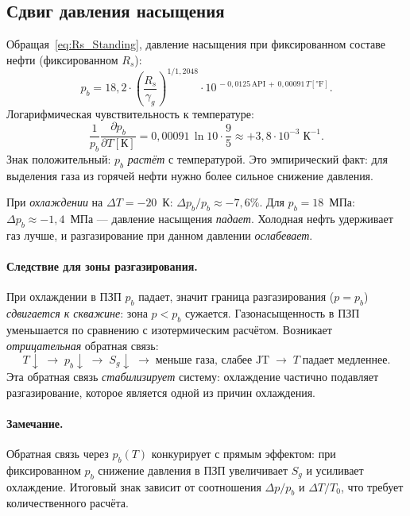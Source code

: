 ﻿\documentclass[12pt,a4paper]{article}
\begin{document}
\subsection{Сдвиг давления насыщения}\label{ssec:pb_shift}

Обращая~\eqref{eq:Rs_Standing}, давление насыщения при
фиксированном составе нефти (фиксированном $R_s$):
\begin{equation}\label{eq:pb_Standing}
  p_b = 18{,}2 \cdot
  \left(\frac{R_s}{\gamma_g}\right)^{1/1{,}2048}
  \cdot 10^{\,-0{,}0125\,\text{API}\,+\,0{,}00091\,T[\text{°F}]}.
\end{equation}
Логарифмическая чувствительность к температуре:
\begin{equation}\label{eq:dpbdT}
  \frac{1}{p_b}\frac{\partial p_b}{\partial T[\text{К}]}
  = 0{,}00091\,\ln 10 \cdot \frac{9}{5}
  \approx +3{,}8 \cdot 10^{-3}\;\text{К}^{-1}.
\end{equation}
Знак положительный: $p_b$ \emph{растёт} с температурой.
Это эмпирический факт: для выделения газа из горячей
нефти нужно более сильное снижение давления.

При \emph{охлаждении} на $\Delta T = -20$~К:
$\Delta p_b / p_b \approx -7{,}6\%$.
Для $p_b = 18$~МПа: $\Delta p_b \approx -1{,}4$~МПа ---
давление насыщения \emph{падает}. Холодная нефть удерживает
газ лучше, и разгазирование при данном давлении
\emph{ослабевает}.

\paragraph{Следствие для зоны разгазирования.}
При охлаждении в ПЗП $p_b$ падает, значит граница
разгазирования ($p = p_b$) \emph{сдвигается к скважине}:
зона $p < p_b$ сужается. Газонасыщенность в ПЗП уменьшается
по сравнению с изотермическим расчётом. Возникает
\emph{отрицательная} обратная связь:
\[
  T\!\downarrow\;\to\; p_b\!\downarrow\;\to\;
  S_g\!\downarrow\;\to\;
  \text{меньше газа, слабее JT}\;\to\;
  T\;\text{падает медленнее}.
\]
Эта обратная связь \emph{стабилизирует} систему:
охлаждение частично подавляет разгазирование, которое
является одной из причин охлаждения.

\paragraph{Замечание.}
Обратная связь через $p_b(T)$ конкурирует с прямым
эффектом: при фиксированном $p_b$ снижение давления
в ПЗП увеличивает $S_g$ и усиливает охлаждение.
Итоговый знак зависит от соотношения $\Delta p / p_b$
и $\Delta T / T_0$, что требует количественного расчёта.
\end{document}
